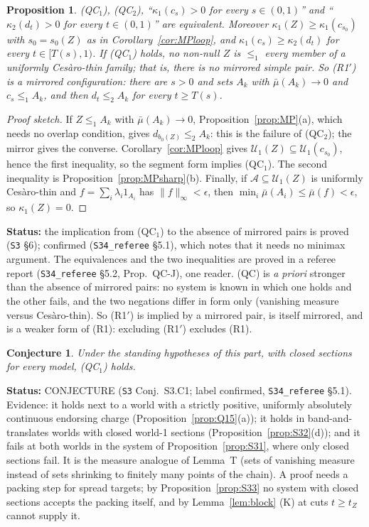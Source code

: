 \documentclass[11pt]{article}
\newtheorem{proposition}[theorem]{Proposition}
\newtheorem{conjecture}[theorem]{Conjecture}
\theoremstyle{definition}
\theoremstyle{remark}
\newcommand{\src}[1]{\texttt{#1}}
\newcommand{\status}[1]{\par\smallskip\noindent\textbf{Status:} #1\par\smallskip}
\begin{document}
\begin{proposition}\label{prop:QCJ}
(QC$_1$), (QC$_2$), ``$\kappa_1(c_s)>0$ for every $s\in(0,1)$'' and ``$\kappa_2(d_t)>0$ for every $t\in(0,1)$'' are equivalent. Moreover $\kappa_1(Z)\ge\kappa_1(c_{s_0})$ with $s_0=s_0(Z)$ as in Corollary~\ref{cor:MPloop}, and $\kappa_1(c_s)\ge\kappa_2(d_t)$ for every $t\in[T(s),1)$. If (QC$_1$) holds, no non-null $Z$ is $\le_1$ every member of a uniformly Ces\`aro-thin family; that is, there is no mirrored simple pair. So (R1$'$) is a mirrored configuration: there are $s>0$ and sets $A_k$ with $\bar\mu(A_k)\to0$ and $c_s\le_1A_k$, and then $d_t\le_2A_k$ for every $t\ge T(s)$.
\end{proposition}
\begin{proof}[Proof sketch]
If $Z\le_1A_k$ with $\bar\mu(A_k)\to0$, Proposition~\ref{prop:MP}(a), which needs no overlap condition, gives $d_{b_0(Z)}\le_2A_k$: this is the failure of (QC$_2$); the mirror gives the converse. Corollary~\ref{cor:MPloop} gives $\mathcal U_1(Z)\subseteq\mathcal U_1(c_{s_0})$, hence the first inequality, so the segment form implies (QC$_1$). The second inequality is Proposition~\ref{prop:MPsharp}(b). Finally, if $\mathcal A\subseteq\mathcal U_1(Z)$ is uniformly Ces\`aro-thin and $f=\sum_i\lambda_i1_{A_i}$ has $\|f\|_\infty<\epsilon$, then $\min_i\bar\mu(A_i)\le\bar\mu(f)<\epsilon$, so $\kappa_1(Z)=0$.
\end{proof}
\status{the implication from (QC$_1$) to the absence of mirrored pairs is proved (\src{S3} \S6); confirmed (\src{S34\_referee} \S5.1), which notes that it needs no minimax argument. The equivalences and the two inequalities are proved in a referee report (\src{S34\_referee} \S5.2, Prop.~QC-J), one reader. (QC) is \emph{a priori} stronger than the absence of mirrored pairs: no system is known in which one holds and the other fails, and the two negations differ in form only (vanishing measure versus Ces\`aro-thin). So (R1$'$) is implied by a mirrored pair, is itself mirrored, and is a weaker form of (R1): excluding (R1$'$) excludes (R1).}

\begin{conjecture}\label{conj:QC}
Under the standing hypotheses of this part, with closed sections for every model, (QC$_1$) holds.
\end{conjecture}
\status{CONJECTURE (\src{S3} Conj.~S3.C1; label confirmed, \src{S34\_referee} \S5.1). Evidence: it holds next to a world with a strictly positive, uniformly absolutely continuous endorsing charge (Proposition~\ref{prop:Q15}(a)); it holds in band-and-translates worlds with closed world-1 sections (Proposition~\ref{prop:S32}(d)); and it fails at both worlds in the system of Proposition~\ref{prop:S31}, where only closed sections fail. It is the measure analogue of Lemma~T (sets of vanishing measure instead of sets shrinking to finitely many points of the chain). A proof needs a packing step for spread targets; by Proposition~\ref{prop:S33} no system with closed sections accepts the packing itself, and by Lemma~\ref{lem:block} (K) at cuts $t\ge t_Z$ cannot supply it.}
\end{document}
